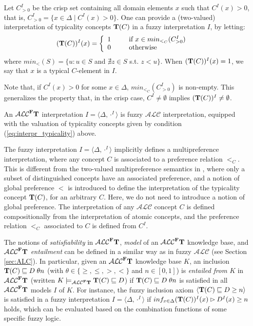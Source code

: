 \documentclass[runningheads]{llncs}
\newcommand{\tip}{{\bf T}}
\newcommand{\alc}{\mathcal{ALC}}
\newcommand{\alcFt}{\mathcal{ALC}^{\Fe}\tip}
\newcommand {\Fe} {{\bf F}}
\begin{document}
Let $C^I_{>0}$ be the crisp set containing all domain elements $x$ such that $C^I(x)>0$, that is, $C^I_{>0}= \{x \in \Delta \mid C^I(x)>0 \}$.
One can provide a (two-valued) interpretation of typicality concepts $\tip(C)$ in a fuzzy interpretation $I$, by letting:
\begin{align}\label{eq:interpr_typicality}
	(\tip(C))^I(x)  & = \left\{\begin{array}{ll}
						 1 & \mbox{ \ \ \ \  if } x \in min_{<_C} (C^I_{>0}) \\
						0 &  \mbox{ \ \ \ \  otherwise } 
					\end{array}\right.
\end{align} 
where $min_<(S)= \{u: u \in S$ and $\nexists z \in S$ s.t. $z < u \}$.  When $(\tip(C))^I(x)=1$, we say that $x$ is a typical $C$-element in $I$.

Note that, if $C^I(x)>0$ for some $x \in \Delta$,  
$min_{<_C} (C^I_{>0})$ is non-empty.
This generalizes the property that, in the crisp case, $C^I\neq \emptyset$ implies  $(\tip(C))^I\neq \emptyset$.

\begin{definition}[$\alcFt$ interpretation]
An $\alcFt$ interpretation $I= \langle \Delta, \cdot^I \rangle$ is  fuzzy $\alc$ interpretation, equipped with the valuation of typicality concepts given by condition (\ref{eq:interpr_typicality}) above.
\end{definition}

The fuzzy interpretation  $I= \langle \Delta, \cdot^I \rangle$ implicitly defines a multipreference interpretation, where any concept $C$ is associated to a preference  relation $<_C$.  This is different from 
the two-valued multipreference semantics in \cite{iclp2020}, where only a subset of distinguished concepts have an associated preference, 
and a notion of global preference $<$ is introduced to define the interpretation of the typicality concept $\tip(C)$, for an arbitrary $C$. Here, we do not need to introduce a notion of global preference. The interpretation of any $\alc$ concept $C$ is defined compositionally from the interpretation of atomic concepts, and the preference relation $<_C$ associated to $C$ is defined from $C^I$. 


 
The notions of {\em satisfiability} in $\alcFt$,   {\em model} of an $\alcFt$ knowledge base, and   $\alcFt$ {\em entailment} can be defined in a similar way as in fuzzy $\alc$ (see Section  \ref{sec:ALC}). 
In particular, given an $\alcFt$ knowledge base $K$, 
an inclusion $\tip(C) \sqsubseteq D \; \theta n$ (with $\theta \in \{\geq, \leq, >, <\}$ and $n \in [0,1]$) is {\em entailed 
from $K$} in $\alcFt$ (written $K \models_{\alcFt} \tip(C) \sqsubseteq D$) 
if $\tip(C) \sqsubseteq D \; \theta n$ is satisfied in all $\alcFt$ models  
$I$ of $K$.
%
For instance, the fuzzy inclusion axiom $\langle \tip(C) \sqsubseteq D \geq n \rangle$  is satisfied in a fuzzy interpretation $I= \langle \Delta, \cdot^I \rangle$ if  $inf_{x \in \Delta}  (\tip(C))^I(x) \rhd D^I(x) \geq n$ holds,  
which can be evaluated based on the combination functions of some specific fuzzy logic.
\end{document}
